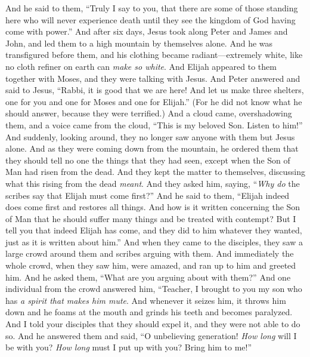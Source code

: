 \begin{biblechapter} %
\verse And he said to them, “Truly I say to you, that there are some of those standing here who will never experience death until they see the kingdom of God having come with power.”
 And after six days, Jesus took along Peter and James and John, and led them to a high mountain by themselves alone. And he was transfigured before them,
\verse and his clothing became radiant—extremely white, like no cloth refiner on earth can \textit{make so white}.
\verse And Elijah appeared to them together with Moses, and they were talking with Jesus.
\verse And Peter answered and said to Jesus, “Rabbi, it is good that we are here! And let us make three shelters, one for you and one for Moses and one for Elijah.”
\verse (For he did not know what he should answer, because they were terrified.)
\verse And a cloud came, overshadowing them, and a voice came from the cloud, “This is my beloved Son. Listen to him!”
\verse And suddenly, looking around, they no longer saw anyone with them but Jesus alone.
\verse And as they were coming down from the mountain, he ordered them that they should tell no one the things that they had seen, except when the Son of Man had risen from the dead.
\verse And they kept the matter to themselves, discussing what this rising from the dead \textit{meant}.
\verse And they asked him, saying, “\textit{Why do} the scribes say that Elijah must come first?”
\verse And he said to them, “Elijah indeed does come first and restores all things. And how is it written concerning the Son of Man that he should suffer many things and be treated with contempt?
\verse But I tell you that indeed Elijah has come, and they did to him whatever they wanted, just as it is written about him.”
 And when they came to the disciples, they saw a large crowd around them and scribes arguing with them.
\verse And immediately the whole crowd, when they saw him, were amazed, and ran up to him and greeted him.
\verse And he asked them, “What are you arguing about with them?”
\verse And one individual from the crowd answered him, “Teacher, I brought to you my son who has \textit{a spirit that makes him mute}.
\verse And whenever it seizes him, it throws him down and he foams at the mouth and grinds his teeth and becomes paralyzed. And I told your disciples that they should expel it, and they were not able to do so.
\verse And he answered them and said, “O unbelieving generation! \textit{How long} will I be with you? \textit{How long} must I put up with you? Bring him to me!”

\end{biblechapter}
